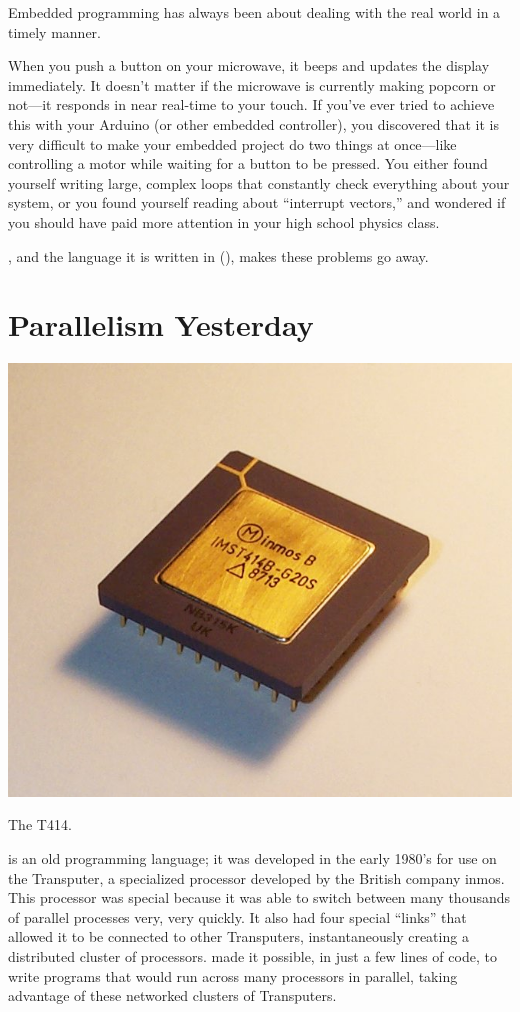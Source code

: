 Embedded programming has always been about dealing with the real world in a timely manner.

When you push a button on your microwave, it beeps and updates the display immediately. It doesn't matter if the microwave is currently making popcorn or not---it responds in near real-time to your touch. If you've ever tried to achieve this with your Arduino (or other embedded controller), you discovered that it is very difficult to make your embedded project do two things at once---like controlling a motor while waiting for a button to be pressed. You either found yourself writing large, complex loops that constantly check everything about your system, or you found yourself reading about ``interrupt vectors,'' and wondered if you should have paid more attention in your high school physics class.

\plumbing, and the language it is written in (\occam), makes these problems go away.

\newpage

\section*{Parallelism Yesterday}
\begin{floatingfigure}[r]{0.4\linewidth}
	  \begin{center}
    	\includegraphics[width=0.4\linewidth]{images/t414}
			\captionsetup{labelformat=empty,justification=centering}
   		\caption{The T414.}
  \end{center}
\end{floatingfigure}


\justoccam is an old programming language; it was developed in the early 1980's for use on the Transputer, a specialized processor developed by the British company inmos. This processor was special because it was able to switch between many thousands of parallel processes very, very quickly. It also had four special ``links'' that allowed it to be connected to other Transputers, instantaneously creating a distributed cluster of processors. \justoccam made it possible, in just a few lines of code, to write programs that would run across many processors in parallel, taking advantage of these networked clusters of Transputers.

